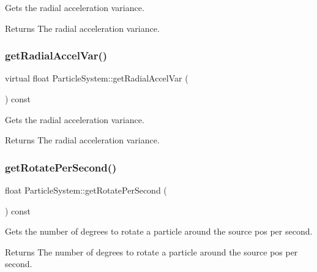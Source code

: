 Gets the radial acceleration variance.

\begin{DoxyReturn}{Returns}
The radial acceleration variance. 
\end{DoxyReturn}
\mbox{\label{classParticleSystem_a31709b2365f5830968148110308ef60a}} 
\subsubsection{\texorpdfstring{get\+Radial\+Accel\+Var()}{getRadialAccelVar()}\hspace{0.1cm}{\footnotesize\ttfamily [2/2]}}
{\footnotesize\ttfamily virtual float Particle\+System\+::get\+Radial\+Accel\+Var (\begin{DoxyParamCaption}{ }\end{DoxyParamCaption}) const\hspace{0.3cm}{\ttfamily [virtual]}}

Gets the radial acceleration variance.

\begin{DoxyReturn}{Returns}
The radial acceleration variance. 
\end{DoxyReturn}
\mbox{\label{classParticleSystem_aa3124fe0f4fe73573246aae7be9bac63}} 
\subsubsection{\texorpdfstring{get\+Rotate\+Per\+Second()}{getRotatePerSecond()}\hspace{0.1cm}{\footnotesize\ttfamily [1/2]}}
{\footnotesize\ttfamily float Particle\+System\+::get\+Rotate\+Per\+Second (\begin{DoxyParamCaption}{ }\end{DoxyParamCaption}) const\hspace{0.3cm}{\ttfamily [virtual]}}

Gets the number of degrees to rotate a particle around the source pos per second.

\begin{DoxyReturn}{Returns}
The number of degrees to rotate a particle around the source pos per second. 
\end{DoxyReturn}
\mbox{\label{classParticleSystem_a8acc5f0150ed8c53b87153d8ac36fec6}} 
